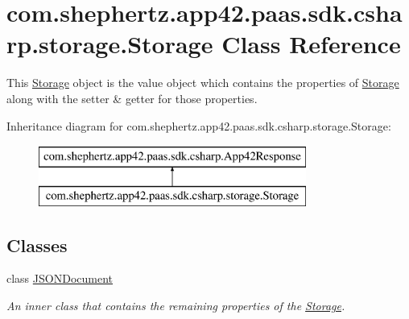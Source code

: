 \hypertarget{classcom_1_1shephertz_1_1app42_1_1paas_1_1sdk_1_1csharp_1_1storage_1_1_storage}{\section{com.\+shephertz.\+app42.\+paas.\+sdk.\+csharp.\+storage.\+Storage Class Reference}
\label{classcom_1_1shephertz_1_1app42_1_1paas_1_1sdk_1_1csharp_1_1storage_1_1_storage}
}


This \hyperlink{classcom_1_1shephertz_1_1app42_1_1paas_1_1sdk_1_1csharp_1_1storage_1_1_storage}{Storage} object is the value object which contains the properties of \hyperlink{classcom_1_1shephertz_1_1app42_1_1paas_1_1sdk_1_1csharp_1_1storage_1_1_storage}{Storage} along with the setter \& getter for those properties.  


Inheritance diagram for com.\+shephertz.\+app42.\+paas.\+sdk.\+csharp.\+storage.\+Storage\+:\begin{figure}[H]
\begin{center}
\leavevmode
\includegraphics[height=2.000000cm]{classcom_1_1shephertz_1_1app42_1_1paas_1_1sdk_1_1csharp_1_1storage_1_1_storage}
\end{center}
\end{figure}
\subsection*{Classes}
\begin{DoxyCompactItemize}
\item 
class \hyperlink{classcom_1_1shephertz_1_1app42_1_1paas_1_1sdk_1_1csharp_1_1storage_1_1_storage_1_1_j_s_o_n_document}{J\+S\+O\+N\+Document}
\begin{DoxyCompactList}\small\item\em An inner class that contains the remaining properties of the \hyperlink{classcom_1_1shephertz_1_1app42_1_1paas_1_1sdk_1_1csharp_1_1storage_1_1_storage}{Storage}. \end{DoxyCompactList}\end{DoxyCompactItemize}
